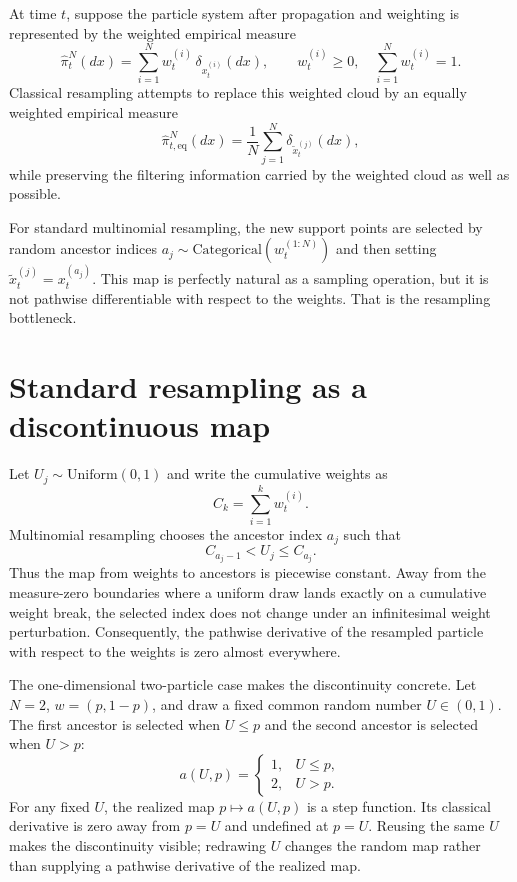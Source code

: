 At time $t$, suppose the particle system after propagation and weighting is
represented by the weighted empirical measure
\begin{equation}
\label{eq:bf-dr-weighted-empirical}
  \hat \pi_t^N(dx)
  = \sum_{i=1}^N w_t^{(i)}\,\delta_{x_t^{(i)}}(dx),
  \qquad
  w_t^{(i)} \ge 0,
  \quad
  \sum_{i=1}^N w_t^{(i)}=1.
\end{equation}
Classical resampling attempts to replace this weighted cloud by an equally
weighted empirical measure
\begin{equation}
\label{eq:bf-dr-equal-weight-empirical}
  \hat \pi_{t,\mathrm{eq}}^N(dx)
  = \frac{1}{N}\sum_{j=1}^N \delta_{\tilde x_t^{(j)}}(dx),
\end{equation}
while preserving the filtering information carried by the weighted cloud as well
as possible.

For standard multinomial resampling, the new support points are selected by
random ancestor indices
$a_j \sim \mathrm{Categorical}(w_t^{(1:N)})$ and then setting
$\tilde x_t^{(j)} = x_t^{(a_j)}$.  This map is perfectly natural as a sampling
operation, but it is not pathwise differentiable with respect to the weights.
That is the resampling bottleneck.

\section{Standard resampling as a discontinuous map}
\label{sec:bf-dr-discontinuous-map}

Let $U_j \sim \mathrm{Uniform}(0,1)$ and write the cumulative weights as
\[
  C_k = \sum_{i=1}^k w_t^{(i)}.
\]
Multinomial resampling chooses the ancestor index $a_j$ such that
\begin{equation}
\label{eq:bf-dr-categorical-selection}
  C_{a_j-1} < U_j \le C_{a_j}.
\end{equation}
Thus the map from weights to ancestors is piecewise constant.  Away from the
measure-zero boundaries where a uniform draw lands exactly on a cumulative
weight break, the selected index does not change under an infinitesimal weight
perturbation.  Consequently, the pathwise derivative of the resampled particle
with respect to the weights is zero almost everywhere.

The one-dimensional two-particle case makes the discontinuity concrete.  Let
$N=2$, $w=(p,1-p)$, and draw a fixed common random number $U\in(0,1)$.  The
first ancestor is selected when $U\le p$ and the second ancestor is selected
when $U>p$:
\begin{equation}
\label{eq:bf-dr-two-particle-discontinuity}
  a(U,p)
  =
  \begin{cases}
    1, & U\le p,\\
    2, & U>p.
  \end{cases}
\end{equation}
For any fixed $U$, the realized map $p\mapsto a(U,p)$ is a step function.  Its
classical derivative is zero away from $p=U$ and undefined at $p=U$.  Reusing
the same $U$ makes the discontinuity visible; redrawing $U$ changes the random
map rather than supplying a pathwise derivative of the realized map.

